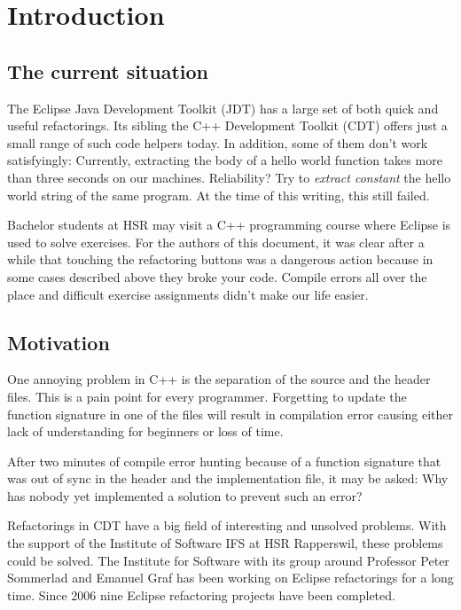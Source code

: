 \chapter{Introduction}
\thispagestyle{fancy}

\section{The current situation}

The Eclipse Java Development Toolkit (JDT) has a large set of both quick and
useful refactorings. Its sibling the C++ Development Toolkit (CDT) offers just a
small range of such code helpers today. In addition, some of them don't work
satisfyingly: Currently, extracting the body of a hello world function takes more
than three seconds on our machines. Reliability? Try to \textit{extract
constant} the hello world string of the same program. At the time of this 
writing, this still failed.

Bachelor students at HSR may visit a C++ programming course where Eclipse is
used to solve exercises. For the authors of this document, it was clear after a
while that touching the refactoring buttons was a dangerous action because in
some cases described above they broke your code. Compile errors all over the
place and difficult exercise assignments didn't make our life easier.

\section{Motivation}

One annoying problem in C++ is the separation of the source and the header
files. This is a pain point for every programmer. Forgetting to update the
function signature in one of the files will result in compilation error causing
either lack of understanding for beginners or loss of time.

After two minutes of compile error hunting because of a function signature that 
was out of sync in the header and the implementation file, it may be asked: Why
has nobody yet implemented a solution to prevent such an error?

Refactorings in CDT have a big field of interesting and unsolved problems. With 
the support of the Institute of Software IFS at HSR Rapperswil, these problems 
could be solved. The Institute for Software with its group around Professor 
Peter Sommerlad and Emanuel Graf has been working on Eclipse refactorings for a 
long time. Since 2006 nine Eclipse refactoring projects have been completed.

